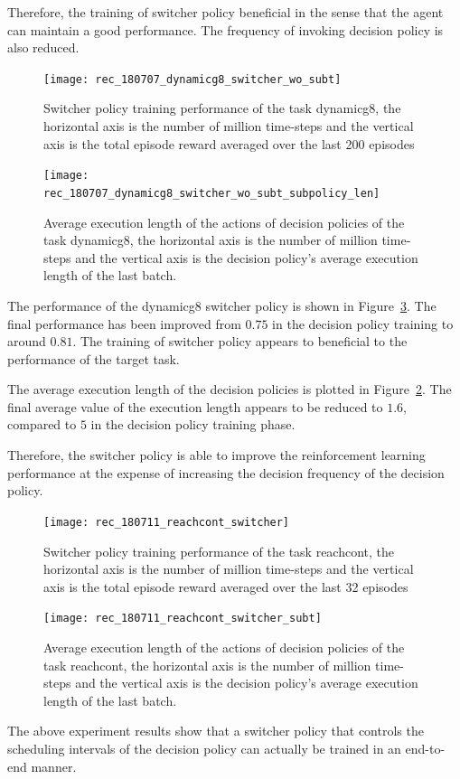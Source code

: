 Therefore, the training of switcher policy beneficial in the sense that the agent can maintain a good performance. The frequency of invoking decision policy is also reduced.
\begin{figure}[!htbp]
	\centering
	\texttt{[image: rec\_180707\_dynamicg8\_switcher\_wo\_subt]}
	\caption{Switcher policy training performance of the task dynamicg8, the horizontal axis is the number of million time-steps and the vertical axis is the total episode reward averaged over the last 200 episodes}
	\label{fig:rec_dynamicg8_switcher}
\end{figure}

\begin{figure}[!htbp]
	\centering
	\texttt{[image: rec\_180707\_dynamicg8\_switcher\_wo\_subt\_subpolicy\_len]}
	\caption{Average execution length of the actions of decision policies of the task dynamicg8, the horizontal axis is the number of million time-steps and the vertical axis is the decision policy's average execution length of the last batch.}
	\label{fig:rec_dynamicg8_avesubt}
\end{figure}

The performance of the dynamicg8 switcher policy is shown in Figure~\ref{fig:rec_reachcont_switcher}. The final performance has been improved from $0.75$ in the decision policy training to around $0.81$. The training of switcher policy appears to beneficial to the performance of the target task.

The average execution length of the decision policies is plotted in Figure~\ref{fig:rec_dynamicg8_avesubt}. The final average value of the execution length appears to be reduced to $1.6$, compared to $5$ in the decision policy training phase.

Therefore, the switcher policy is able to improve the reinforcement learning performance at the expense of increasing the decision frequency of the decision policy.

\begin{figure}[!htbp]
	\centering
	\texttt{[image: rec\_180711\_reachcont\_switcher]}
	\caption{Switcher policy training performance of the task reachcont, the horizontal axis is the number of million time-steps and the vertical axis is the total episode reward averaged over the last 32 episodes}
	\label{fig:rec_reachcont_switcher}
\end{figure}

\begin{figure}[!htbp]
	\centering
	\texttt{[image: rec\_180711\_reachcont\_switcher\_subt]}
	\caption{Average execution length of the actions of decision policies of the task reachcont, the horizontal axis is the number of million time-steps and the vertical axis is the decision policy's average execution length of the last batch.}
	\label{fig:rec_reachcont_switcher_subt}
\end{figure}

The above experiment results show that a switcher policy that controls the scheduling intervals of the decision policy can actually be trained in an end-to-end manner.